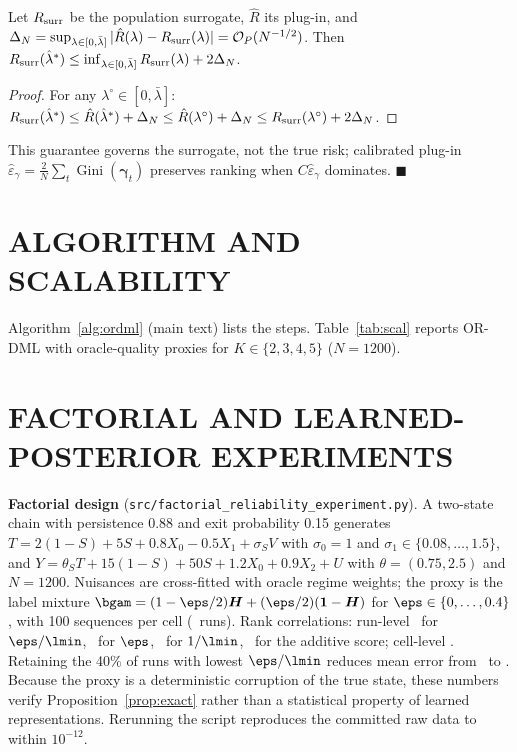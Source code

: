 \begin{lemma}
\label{lem:surrogate_oracle}
Let $R_{\rm surr}$ be the population surrogate, $\hat R$ its plug-in, and $\Delta_N=\sup_{\lambda\in[0,\bar\lambda]}|\hat R(\lambda)-R_{\rm surr}(\lambda)|=\mathcal{O}_P(N^{-1/2})$.
Then $R_{\rm surr}(\hat\lambda^*)\le\inf_{\lambda\in[0,\bar\lambda]}R_{\rm surr}(\lambda)+2\Delta_N$.
\end{lemma}
\begin{proof}
For any $\lambda^\circ\in[0,\bar\lambda]$: $R_{\rm surr}(\hat\lambda^*)\le\hat R(\hat\lambda^*)+\Delta_N\le\hat R(\lambda^\circ)+\Delta_N\le R_{\rm surr}(\lambda^\circ)+2\Delta_N$.
\end{proof}
This guarantee governs the surrogate, not the true risk; calibrated plug-in $\hat\varepsilon_\gamma = \frac{2}{N}\sum_t \operatorname{Gini}(\boldsymbol\gamma_t)$ preserves ranking when $C\hat\varepsilon_\gamma$ dominates. $\blacksquare$

\section{ALGORITHM AND SCALABILITY}
\label{app:algorithm}
Algorithm~\ref{alg:ordml} (main text) lists the steps.
Table~\ref{tab:scal} reports OR-DML with oracle-quality proxies for $K\in\{2,3,4,5\}$ ($N=1200$).
\begin{table}[h]\centering\footnotesize
\caption{Multi-regime scalability (\texttt{reports/multiregime\_scalability\_summary.csv}).}\label{tab:scal}

\end{table}

\section{FACTORIAL AND LEARNED-POSTERIOR EXPERIMENTS}
\label{app:factorial}
\textbf{Factorial design} (\texttt{src/factorial\_reliability\_experiment.py}). A two-state chain with persistence 0.88 and exit probability 0.15 generates $T=2(1{-}S)+5S+0.8X_0-0.5X_1+\sigma_SV$ with $\sigma_0=1$ and $\sigma_1\in\{0.08,\dots,1.5\}$, and $Y=\theta_ST+15(1{-}S)+50S+1.2X_0+0.9X_2+U$ with $\theta=(0.75,2.5)$ and $N=1200$. Nuisances are cross-fitted with oracle regime weights; the proxy is the label mixture $\bgam=(1-\eps/2)\boldsymbol H+(\eps/2)(\boldsymbol 1-\boldsymbol H)$ for $\eps\in\{0,\dots,0.4\}$, with 100 sequences per cell (\FacNRuns\ runs). Rank correlations: run-level \FacRhoD\ for $\eps/\lmin$, \FacRhoEps\ for $\eps$, \FacRhoLam\ for $1/\lmin$, \FacRhoAdd\ for the additive score; cell-level \FacRhoDCell. Retaining the 40\% of runs with lowest $\eps/\lmin$ reduces mean error from \FacFullErr\ to \FacRetainErr. Because the proxy is a deterministic corruption of the true state, these numbers verify Proposition~\ref{prop:exact} rather than a statistical property of learned representations. Rerunning the script reproduces the committed raw data to within $10^{-12}$.

